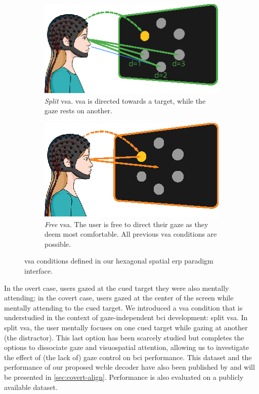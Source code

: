\begin{figure}
  \begin{subfigure}[t]{.45\textwidth}
    \includegraphics[width=\textwidth]{figures/gaze_independence/attention_split.eps}
    \caption[Split \ac{vsa}]{%
      \emph{Split} \ac{vsa}.
      \Ac{vsa} is directed towards a target, while the gaze rests on another.
    }
    \label{fig:gaze/vsa/split}
  \end{subfigure}\hfill%
   \begin{subfigure}[t]{.45\textwidth}
    \includegraphics[width=\textwidth]{figures/gaze_independence/attention_free.eps}
    \caption[Free \ac{vsa}]{%
      \emph{Free} \ac{vsa}.
      The user is free to direct their gaze as they deem most comfortable.
      All previous \ac{vsa} conditions are possible.
    }
    \label{fig:gaze/vsa/free}
  \end{subfigure}\hfill%
  \caption[\Ac{vsa} conditions]{%
    \Acl{vsa} conditions defined in our hexagonal spatial \ac{erp} paradigm interface.
  }
  \label{fig:gaze/vsa}
\end{figure}

In the overt case, users gazed at the cued
target they were also mentally attending; in the covert case, users
gazed at the center of the screen while mentally attending to the cued target.
We introduced a \ac{vsa} condition that is understudied in the context of
gaze-independent \ac{bci} development: split \ac{vsa}.
In split \ac{vsa}, the user mentally focuses on one cued target while gazing at
another (the distractor).
This last option has been scarcely studied but completes
the options to dissociate gaze and visuospatial attention, allowing us to
investigate the effect of (the lack of) gaze control on \ac{bci} performance.
This dataset and the performance of our proposed \ac{wcble} decoder have also been
published by \textcite{VanDenKerchove2024} and will be presented in
\cref{sec:covert-align}.
Performance is also evaluated on a publicly available dataset.

